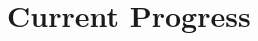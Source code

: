 \documentclass{beamer}
\begin{document}
%  
% 










\section{Current Progress}

% 
% 
% 
% 
\end{document}
